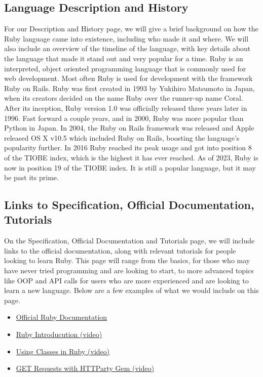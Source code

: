 \documentclass{article}
\begin{document}
\subsection{Language Description and History}
  For our Description and History page, we will give a brief background on how the Ruby language came into existence, including who made it and where.
  We will also include an overview of the timeline of the language, with key details about the language that made it stand out and very popular for a time.
  \newline
  \newline
  Ruby is an interpreted, object oriented programming language that is commonly used for web development. Most often Ruby is used for development with the framework Ruby on Rails. Ruby was first created in 1993 by Yukihiro Matsumoto in Japan, when its creators decided on the name Ruby over the runner-up name Coral. After its inception, Ruby version 1.0 was officially released three years later in 1996. Fast forward a couple years, and in 
  2000, Ruby was more popular than Python in Japan. In 2004, the Ruby on Rails framework was released and Apple released OS X v10.5 which included Ruby on Rails, boosting the language's popularity further. In 2016 Ruby reached its peak usage and got into position 8 of the TIOBE index, which is the highest it has ever reached.
  As of 2023, Ruby is now in position 19 of the TIOBE index. It is still a popular language, but it may be past its prime.

\subsection{Links to Specification, Official Documentation, Tutorials}
  On the Specification, Official Documentation and Tutorials page, we will include links to the official documentation, along with relevant tutorials for people looking to learn Ruby.
  This page will range from the basics, for those who may have never tried programming and are looking to start, to more advanced topics like OOP and API calls for users who are more experienced and are looking to 
  learn a new language. Below are a few examples of what we would include on this page.
  \newline
  \newline
  \begin{itemize}
    \item \href{https://www.ruby-lang.org/en/documentation/}{Official Ruby Documentation}
    \item \href{https://www.youtube.com/watch?v=ml5sNqftiK4}{Ruby Introducution (video)}
    \item \href{https://www.youtube.com/watch?v=mPdD8ms5gEQ}{Using Classes in Ruby (video)}
    \item \href{https://www.youtube.com/watch?v=QJKQBPzZRTQ}{GET Requests with HTTParty Gem (video)}
  \end{itemize}
\end{document}
